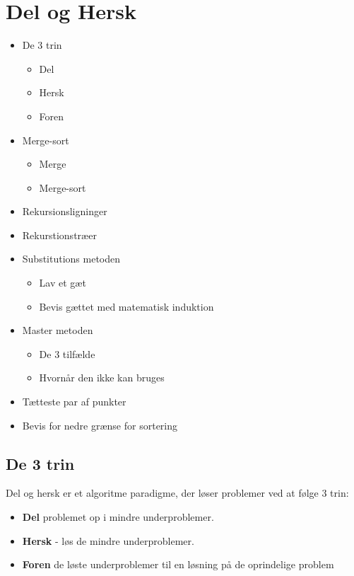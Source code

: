 \section{Del og Hersk}
\hrulefill
\begin{itemize}
\item De 3 trin
  \begin{itemize}
  \item Del
  \item Hersk
  \item Foren
  \end{itemize}
\item Merge-sort
  \begin{itemize}
  \item Merge
  \item Merge-sort
  \end{itemize}
\item Rekursionsligninger
\item Rekurstionstræer
\item Substitutions metoden
  \begin{itemize}
  \item Lav et gæt
  \item Bevis gættet med matematisk induktion
  \end{itemize}
\item Master metoden
  \begin{itemize}
  \item De 3 tilfælde
  \item Hvornår den ikke kan bruges
  \end{itemize}
\item Tætteste par af punkter
\item Bevis for nedre grænse for sortering
\end{itemize}

\newpage
\subsection{De 3 trin}
Del og hersk er et algoritme paradigme, der løser problemer ved at følge 3 trin:\\
\begin{itemize}
\item \textbf{Del} problemet op i mindre underproblemer.
\item \textbf{Hersk} - løs de mindre underproblemer.
\item \textbf{Foren} de løste underproblemer til en løsning på de oprindelige problem
\end{itemize}

